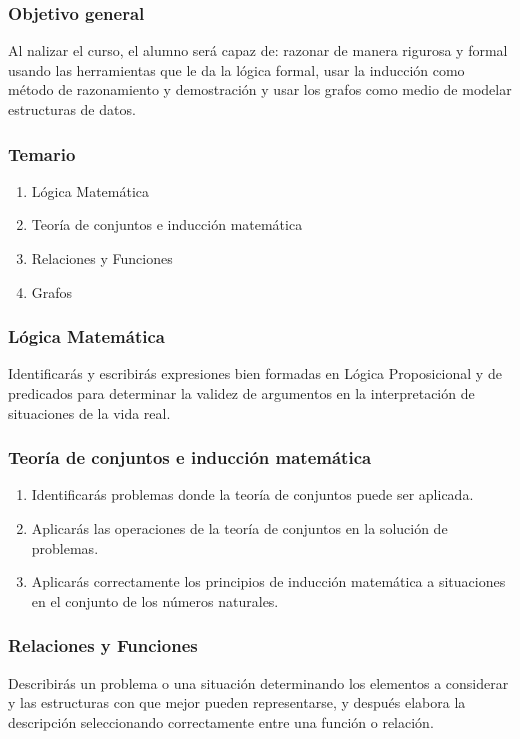 \documentclass[xcolor={svgnames},
  hyperref={colorlinks}, 
  spanish, 12pt]{beamer}
\numberwithin{equation}{section} %
\numberwithin{figure}{section} %
\theoremstyle{plain}
\theoremstyle{definition}
\theoremstyle{remark}
\begin{document}
\begin{frame}
 \frametitle{Objetivo general}
 Al nalizar el curso, el alumno será capaz de: razonar de manera rigurosa y formal usando las herramientas que le da la
lógica formal, usar la inducción como método de razonamiento y demostración y usar los grafos como medio de modelar
estructuras de datos.

\end{frame}


\begin{frame}
 \frametitle{Temario}

 \begin{enumerate}
  \item Lógica Matemática \pause
  \item Teoría de conjuntos e inducción matemática \pause
  \item Relaciones y Funciones \pause
  \item Grafos
 \end{enumerate}
\end{frame}

\begin{frame}
 \frametitle{Lógica Matemática}
 Identificar\'as y escribir\'as expresiones bien formadas en Lógica Proposicional y de predicados para determinar la validez de argumentos en la interpretaci\'on de situaciones de la vida real.
\end{frame}

\begin{frame}
 \frametitle{Teoría de conjuntos e inducción matemática}
 \begin{enumerate}
  \item  Identificar\'as problemas donde la teoría de conjuntos puede ser aplicada.
 \pause
  \item Aplicar\'as las operaciones de la teoría de conjuntos en la solución de problemas. \pause
  \item Aplicar\'as correctamente los principios de inducción matemática a situaciones en el conjunto de los números naturales.

 \end{enumerate}

\end{frame}

\begin{frame}
 \frametitle{Relaciones y Funciones}
 Describir\'as un problema o una situación determinando los elementos a considerar y las estructuras con que mejor pueden
representarse, y después elabora la descripción seleccionando correctamente entre una función o relación.

\end{frame}
\end{document}
